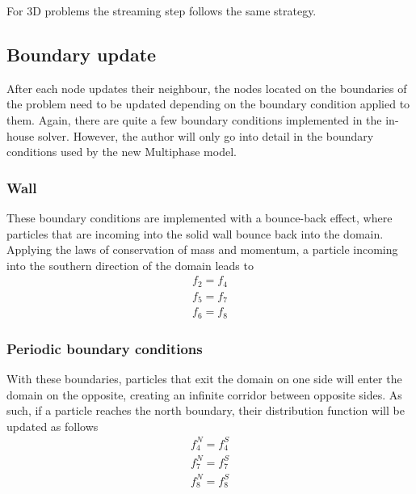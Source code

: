 \documentclass[12pt, openany]{book}
\begin{document}
For 3D problems the streaming step follows the same strategy.
\subsection{Boundary update}\label{sec:boundary}
After each node updates their neighbour, the nodes located on the boundaries of the problem need to be updated depending on the boundary condition applied to them. Again, there are quite a few boundary conditions implemented in the in-house solver. However, the author will only go into detail in the boundary conditions used by the new Multiphase model.\par
\subsubsection{Wall}
	These boundary conditions are implemented with a bounce-back effect, where particles that are incoming into the solid wall bounce back into the domain. Applying the laws of conservation of mass and momentum, a particle incoming into the southern direction of the domain leads to  
	\begin{equation*}
		\begin{aligned}
			f_2 = f_4 \\
			f_5 = f_7 \\
			f_6 = f_8
		\end{aligned}
	\end{equation*}
	\subsubsection{Periodic boundary conditions} 
	With these boundaries, particles that exit the domain on one side will enter the domain on the opposite, creating an infinite corridor between opposite sides. As such, if a particle reaches the north boundary, their distribution function will be updated as follows
	\begin{equation*}
		\begin{aligned}
			f_4^N = f_4^S \\
			f_7^N = f_7^S \\
			f_8^N = f_8^S
		\end{aligned}
	\end{equation*}
\end{document}
